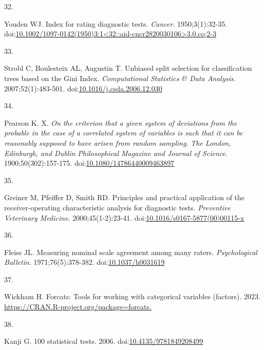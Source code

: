 \documentclass[
]{book}
\newlength{\cslhangindent}
\newlength{\csllabelwidth}
\newlength{\cslentryspacingunit} %
\newenvironment{CSLReferences}[2] %
 {%
  \setlength{\parindent}{0pt}
  \ifodd #1
  \let\oldpar\par
  \def\par{\hangindent=\cslhangindent\oldpar}
  \fi
  \setlength{\parskip}{#2\cslentryspacingunit}
 }%
 {}
\newcommand{\CSLLeftMargin}[1]{\parbox[t]{\csllabelwidth}{#1}}
\newcommand{\CSLRightInline}[1]{\parbox[t]{\linewidth - \csllabelwidth}{#1}\break}
\begin{document}
\begin{CSLReferences}{0}{0}
\leavevmode{}%
\CSLLeftMargin{32. }%
\CSLRightInline{Youden WJ. Index for rating diagnostic tests. \emph{Cancer}. 1950;3(1):32-35. doi:\href{https://doi.org/10.1002/1097-0142(1950)3:1\%3C32::aid-cncr2820030106\%3E3.0.co;2-3}{10.1002/1097-0142(1950)3:1\textless32::aid-cncr2820030106\textgreater3.0.co;2-3}}

\leavevmode{}%
\CSLLeftMargin{33. }%
\CSLRightInline{Strobl C, Boulesteix AL, Augustin T. Unbiased split selection for classification trees based on the Gini Index. \emph{Computational Statistics \& Data Analysis}. 2007;52(1):483-501. doi:\href{https://doi.org/10.1016/j.csda.2006.12.030}{10.1016/j.csda.2006.12.030}}

\leavevmode{}%
\CSLLeftMargin{34. }%
\CSLRightInline{Pearson K. X. {\emph{On the criterion that a given system of deviations from the probable in the case of a correlated system of variables is such that it can be reasonably supposed to have arisen from random sampling}}. \emph{The London, Edinburgh, and Dublin Philosophical Magazine and Journal of Science}. 1900;50(302):157-175. doi:\href{https://doi.org/10.1080/14786440009463897}{10.1080/14786440009463897}}

\leavevmode{}%
\CSLLeftMargin{35. }%
\CSLRightInline{Greiner M, Pfeiffer D, Smith RD. Principles and practical application of the receiver-operating characteristic analysis for diagnostic tests. \emph{Preventive Veterinary Medicine}. 2000;45(1-2):23-41. doi:\href{https://doi.org/10.1016/s0167-5877(00)00115-x}{10.1016/s0167-5877(00)00115-x}}

\leavevmode{}%
\CSLLeftMargin{36. }%
\CSLRightInline{Fleiss JL. Measuring nominal scale agreement among many raters. \emph{Psychological Bulletin}. 1971;76(5):378-382. doi:\href{https://doi.org/10.1037/h0031619}{10.1037/h0031619}}

\leavevmode{}%
\CSLLeftMargin{37. }%
\CSLRightInline{Wickham H. Forcats: Tools for working with categorical variables (factors). 2023. \href{https://CRAN.R-project.org/package=forcats}{https://CRAN.R-project.org/package=forcats.}}

\leavevmode{}%
\CSLLeftMargin{38. }%
\CSLRightInline{Kanji G. 100 statistical tests. 2006. doi:\href{https://doi.org/10.4135/9781849208499}{10.4135/9781849208499}}


\end{CSLReferences}
\end{document}
